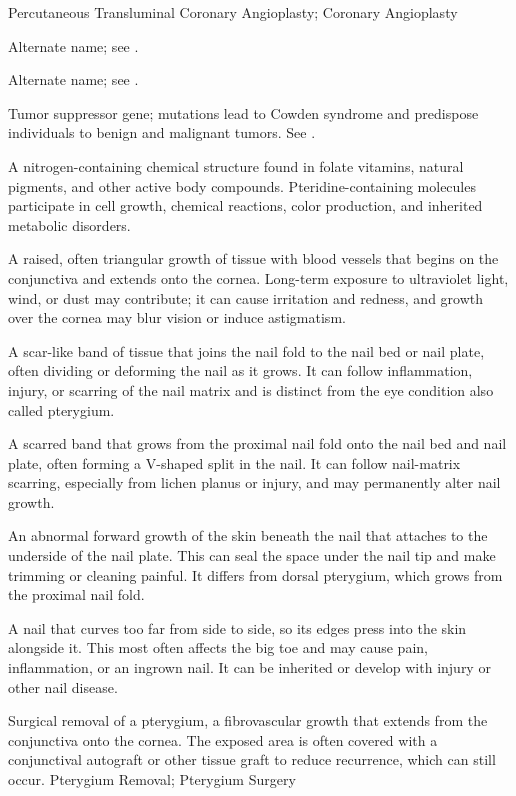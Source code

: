 \synonyms
Percutaneous Transluminal Coronary Angioplasty; Coronary Angioplasty

 Alternate name; see .

 Alternate name; see .

 Tumor suppressor gene; mutations lead to Cowden syndrome and predispose individuals to benign and malignant tumors. See .

 A nitrogen-containing chemical structure found in folate vitamins, natural pigments, and other active body compounds. Pteridine-containing molecules participate in cell growth, chemical reactions, color production, and inherited metabolic disorders.

 A raised, often triangular growth of tissue with blood vessels that begins on the conjunctiva and extends onto the cornea. Long-term exposure to ultraviolet light, wind, or dust may contribute; it can cause irritation and redness, and growth over the cornea may blur vision or induce astigmatism.

 A scar-like band of tissue that joins the
  nail fold to the nail bed or nail plate, often dividing or deforming
  the nail as it grows. It can follow inflammation, injury, or scarring
  of the nail matrix and is distinct from the eye condition also called
  pterygium.

 A scarred band that grows from the proximal
  nail fold onto the nail bed and nail plate, often forming a V-shaped
  split in the nail. It can follow nail-matrix scarring, especially
  from lichen planus or injury, and may permanently alter nail growth.

 An abnormal
  forward growth of the skin beneath the nail that attaches to the
  underside of the nail plate. This can seal the space under the nail
  tip and make trimming or cleaning painful. It differs from dorsal
  pterygium, which grows from the proximal nail fold.

 A nail that curves too far from side to
  side, so its edges press into the skin alongside it. This most often
  affects the big toe and may cause pain, inflammation, or an ingrown
  nail. It can be inherited or develop with injury or other nail disease.

 Surgical removal of a pterygium, a fibrovascular growth that extends from the conjunctiva onto the cornea. The exposed area is often covered with a conjunctival autograft or other tissue graft to reduce recurrence, which can still occur.
\synonyms
Pterygium Removal; Pterygium Surgery

